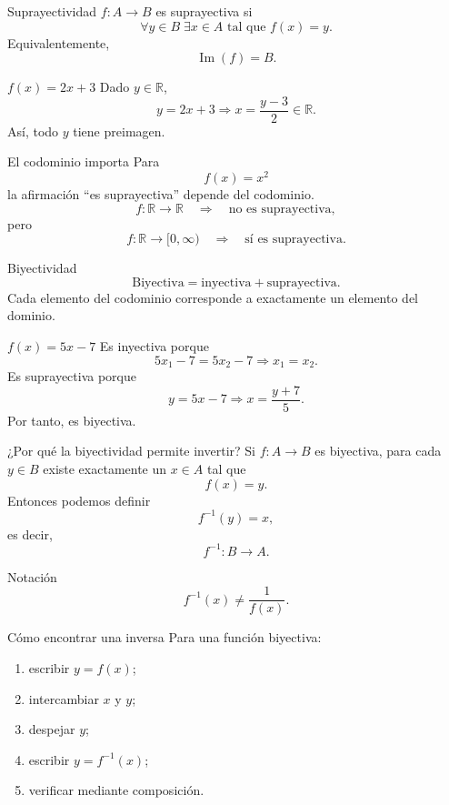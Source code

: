 \documentclass[aspectratio=169,10pt]{beamer}
\begin{document}
\begin{frame}{Suprayectividad}
$f:A\to B$ es suprayectiva si
\[
\forall y\in B\;\exists x\in A\text{ tal que }f(x)=y.
\]
Equivalentemente,
\[
\boxed{\operatorname{Im}(f)=B.}
\]
\begin{exampleblock}{$f(x)=2x+3$}
Dado $y\in\mathbb R$,
\[
y=2x+3\Longrightarrow x=\frac{y-3}{2}\in\mathbb R.
\]
Así, todo $y$ tiene preimagen.
\end{exampleblock}
\end{frame}

\begin{frame}{El codominio importa}
Para
\[
f(x)=x^2
\]
la afirmación ``es suprayectiva'' depende del codominio.
\[
f:\mathbb R\to\mathbb R
\quad\Rightarrow\quad\text{no es suprayectiva},
\]
pero
\[
f:\mathbb R\to[0,\infty)
\quad\Rightarrow\quad\text{sí es suprayectiva}.
\]
\end{frame}

\begin{frame}{Biyectividad}
\[
\boxed{\text{Biyectiva}=\text{inyectiva}+\text{suprayectiva}.}
\]
Cada elemento del codominio corresponde a exactamente un elemento del dominio.
\begin{exampleblock}{$f(x)=5x-7$}
Es inyectiva porque
\[
5x_1-7=5x_2-7\Longrightarrow x_1=x_2.
\]
Es suprayectiva porque
\[
y=5x-7\Longrightarrow x=\frac{y+7}{5}.
\]
Por tanto, es biyectiva.
\end{exampleblock}
\end{frame}

\begin{frame}{¿Por qué la biyectividad permite invertir?}
Si $f:A\to B$ es biyectiva, para cada $y\in B$ existe exactamente un $x\in A$ tal que
\[
f(x)=y.
\]
Entonces podemos definir
\[
f^{-1}(y)=x,
\]
es decir,
\[
f^{-1}:B\to A.
\]
\begin{alertblock}{Notación}
\[
f^{-1}(x)\neq\frac{1}{f(x)}.
\]
\end{alertblock}
\end{frame}

\begin{frame}{Cómo encontrar una inversa}
Para una función biyectiva:
\begin{enumerate}
\item escribir $y=f(x)$;
\item intercambiar $x$ y $y$;
\item despejar $y$;
\item escribir $y=f^{-1}(x)$;
\item verificar mediante composición.
\end{enumerate}
\end{frame}
\end{document}
